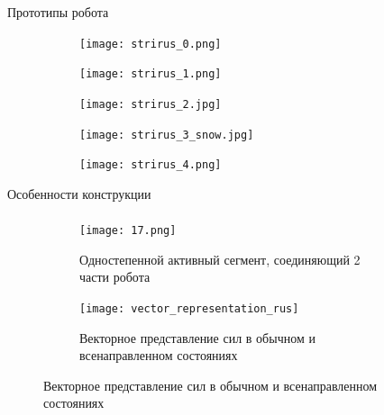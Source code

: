 \begin{frame}[c]{Прототипы робота}
    \begin{figure}[H]
        \begin{subfigure}{0.32\textwidth}
            \centering\texttt{[image: strirus\_0.png]}
        \end{subfigure}
        \begin{subfigure}{0.32\textwidth}
            \centering\texttt{[image: strirus\_1.png]}
        \end{subfigure}
        \begin{subfigure}{0.32\textwidth}
            \centering\texttt{[image: strirus\_2.jpg]}
        \end{subfigure}

        \begin{subfigure}{0.32\textwidth}
            \centering\texttt{[image: strirus\_3\_snow.jpg]}
        \end{subfigure}
        \begin{subfigure}{0.32\textwidth}
            \centering\texttt{[image: strirus\_4.png]}
        \end{subfigure}
    \end{figure}
\end{frame}


\begin{frame}[c]{Особенности конструкции}
    \framesubtitle{}
    \begin{figure}[H]
        \begin{subfigure}{0.39\textwidth}
            \centering\texttt{[image: 17.png]}
            \caption*{Одностепенной активный сегмент, соединяющий 2 части робота}
        \end{subfigure}
        \begin{subfigure}{0.59\textwidth}
            \centering\texttt{[image: vector\_representation\_rus]}
            \caption*{Векторное представление сил в обычном и всенаправленном состояниях}
        \end{subfigure}
    \end{figure}
\end{frame}

